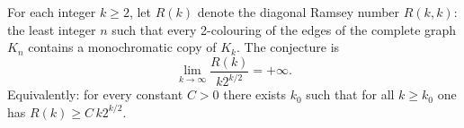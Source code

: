 For each integer $k\ge 2$, let $R(k)$ denote the diagonal Ramsey number $R(k,k)$: the least integer $n$ such that every 2-colouring of the edges of the complete graph $K_n$ contains a monochromatic copy of $K_k$.
The conjecture is
\[
\lim_{k\to\infty} \frac{R(k)}{k2^{k/2}} = +\infty.
\]
Equivalently: for every constant $C>0$ there exists $k_0$ such that for all $k\ge k_0$ one has $R(k)\ge C\,k2^{k/2}$.
